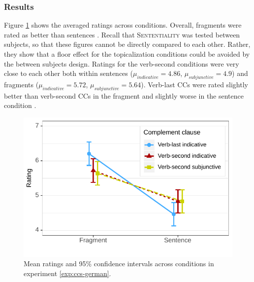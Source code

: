 \subsubsection{Results}\label{sec:ccs-german-results}

Figure \ref{fig:ccs-german-estimates} shows the averaged ratings across conditions. Overall, fragments  were rated as better than sentences .  Recall that \textsc{Sententiality} was tested between subjects, so that these figures cannot be directly compared to each other. Rather, they show that a floor effect for the topicalization conditions could be avoided by the between subjects design. Ratings for the verb-second conditions were very close to each other both within sentences ($\mu_{indicative} = 4.86$, $\mu_{subjunctive} = 4.9$) and fragments ($\mu_{indicative} = 5.72$, $\mu_{subjunctive} = 5.64$). Verb-last CCs were rated slightly better than verb-second CCs in the fragment  and slightly worse in the sentence condition . 

\begin{figure}[t]
\includegraphics[scale=1]{figures/ex2b_ccs_de_lc_estimates}
 \caption{Mean ratings and 95\% confidence intervals across conditions in experiment \ref{exp:ccs-german}. \label{fig:ccs-german-estimates}}
\end{figure}

